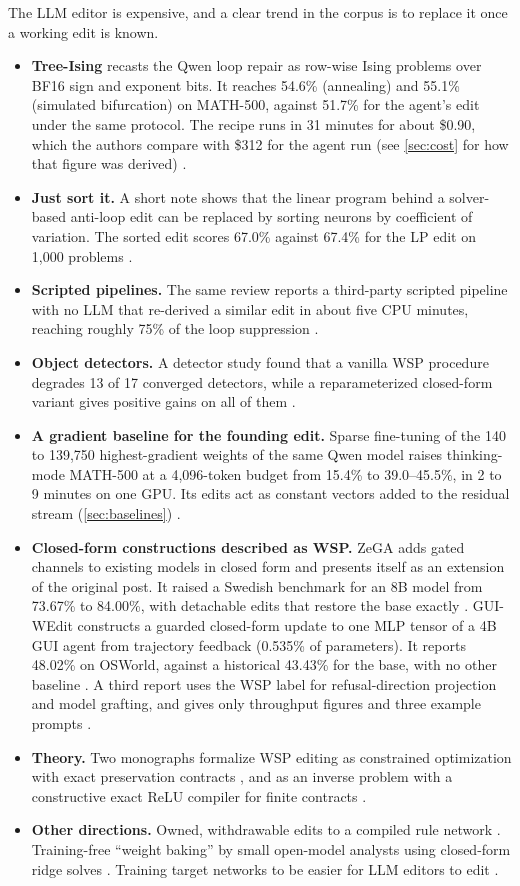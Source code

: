 The LLM editor is expensive, and a clear trend in the corpus is to replace it once a working edit is known.
\begin{itemize}[leftmargin=*,itemsep=2pt]
\item \textbf{Tree-Ising} recasts the Qwen loop repair as row-wise Ising problems over BF16 sign and exponent bits. It reaches 54.6\% (annealing) and 55.1\% (simulated bifurcation) on MATH-500, against 51.7\% for the agent's edit under the same protocol. The recipe runs in 31 minutes for about \$0.90, which the authors compare with \$312 for the agent run (see \cref{sec:cost} for how that figure was derived) \citep{ax2611_14210}.
\item \textbf{Just sort it.} A short note shows that the linear program behind a solver-based anti-loop edit can be replaced by sorting neurons by coefficient of variation. The sorted edit scores 67.0\% against 67.4\% for the LP edit on 1{,}000 problems \citep{ax2611_21432}.
\item \textbf{Scripted pipelines.} The same review reports a third-party scripted pipeline with no LLM that re-derived a similar edit in about five CPU minutes, reaching roughly 75\% of the loop suppression \citep{zen23954378}.
\item \textbf{Object detectors.} A detector study found that a vanilla WSP procedure degrades 13 of 17 converged detectors, while a reparameterized closed-form variant gives positive gains on all of them \citep{ax2611_29882}.
\item \textbf{A gradient baseline for the founding edit.} Sparse fine-tuning of the 140 to 139{,}750 highest-gradient weights of the same Qwen model raises thinking-mode MATH-500 at a 4{,}096-token budget from 15.4\% to 39.0--45.5\%, in 2 to 9 minutes on one GPU. Its edits act as constant vectors added to the residual stream (\cref{sec:baselines}) \citep{ax2611_33133}.
\item \textbf{Closed-form constructions described as WSP.} ZeGA adds gated channels to existing models in closed form and presents itself as an extension of the original post. It raised a Swedish benchmark for an 8B model from 73.67\% to 84.00\%, with detachable edits that restore the base exactly \citep{zen24168084}. GUI-WEdit constructs a guarded closed-form update to one MLP tensor of a 4B GUI agent from trajectory feedback (0.535\% of parameters). It reports 48.02\% on OSWorld, against a historical 43.43\% for the base, with no other baseline \citep{ax2611_32332}. A third report uses the WSP label for refusal-direction projection and model grafting, and gives only throughput figures and three example prompts \citep{zen23958069}.
\item \textbf{Theory.} Two monographs formalize WSP editing as constrained optimization with exact preservation contracts \citep{zen23933590}, and as an inverse problem with a constructive exact ReLU compiler for finite contracts \citep{zen24198536}.
\item \textbf{Other directions.} Owned, withdrawable edits to a compiled rule network \citep{ax2611_15917}. Training-free ``weight baking'' by small open-model analysts using closed-form ridge solves \citep{ax2611_21310}. Training target networks to be easier for LLM editors to edit \citep{ax2611_26408}.
\end{itemize}
